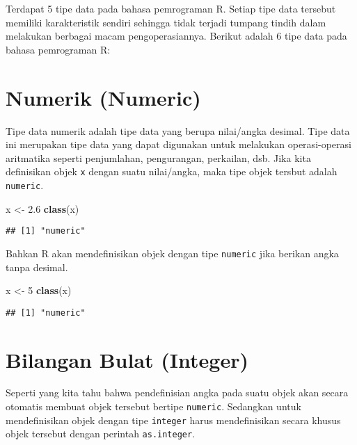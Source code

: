 \documentclass[
]{book}
\newenvironment{Shaded}{\begin{snugshade}}{\end{snugshade}}
\newcommand{\DecValTok}[1]{\textcolor[rgb]{0.00,0.00,0.81}{#1}}
\newcommand{\FloatTok}[1]{\textcolor[rgb]{0.00,0.00,0.81}{#1}}
\newcommand{\KeywordTok}[1]{\textcolor[rgb]{0.13,0.29,0.53}{\textbf{#1}}}
\newcommand{\NormalTok}[1]{#1}
\newcommand{\StringTok}[1]{\textcolor[rgb]{0.31,0.60,0.02}{#1}}
\begin{document}
Terdapat 5 tipe data pada bahasa pemrograman R. Setiap tipe data tersebut memiliki karakteristik sendiri sehingga tidak terjadi tumpang tindih dalam melakukan berbagai macam pengoperasiannya. Berikut adalah 6 tipe data pada bahasa pemrograman R:

\hypertarget{numeric}{%
\section{Numerik (Numeric)}\label{numeric}}

Tipe data numerik adalah tipe data yang berupa nilai/angka desimal. Tipe data ini merupakan tipe data yang dapat digunakan untuk melakukan operasi-operasi aritmatika seperti penjumlahan, pengurangan, perkailan, dsb. Jika kita definisikan objek \texttt{x} dengan suatu nilai/angka, maka tipe objek tersbut adalah \texttt{numeric}.

\begin{Shaded}
\begin{Highlighting}[]
\NormalTok{x <-}\StringTok{ }\FloatTok{2.6}
\KeywordTok{class}\NormalTok{(x)}
\end{Highlighting}
\end{Shaded}

\begin{verbatim}
## [1] "numeric"
\end{verbatim}

Bahkan R akan mendefinisikan objek dengan tipe \texttt{numeric} jika berikan angka tanpa desimal.

\begin{Shaded}
\begin{Highlighting}[]
\NormalTok{x <-}\StringTok{ }\DecValTok{5}
\KeywordTok{class}\NormalTok{(x)}
\end{Highlighting}
\end{Shaded}

\begin{verbatim}
## [1] "numeric"
\end{verbatim}

\hypertarget{integer}{%
\section{Bilangan Bulat (Integer)}\label{integer}}

Seperti yang kita tahu bahwa pendefinisian angka pada suatu objek akan secara otomatis membuat objek tersebut bertipe \texttt{numeric}. Sedangkan untuk mendefinisikan objek dengan tipe \texttt{integer} harus mendefinisikan secara khusus objek tersebut dengan perintah \texttt{as.integer}.
\end{document}
